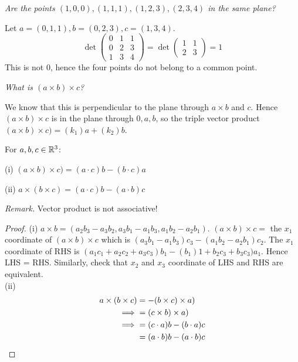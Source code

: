 \documentclass[10pt]{scrartcl}
\begin{document}
\begin{example}
\emph{Are the points $(1,0,0),(1,1,1),(1,2,3),(2,3,4)$ in the same plane? }

Let $a = (0,1,1), b = (0,2,3) , c = (1,3,4)$. 
\[
  \det\begin{pmatrix}
0 & 1 & 1 \\ 0 & 2 & 3 \\ 1 & 3 & 4	
\end{pmatrix} = \det\begin{pmatrix}
1 & 1 \\ 2 & 3 	
\end{pmatrix} = 1
\]
This is not $0$, hence the four points do not belong to a common point. 
\end{example}\vsp


\emph{What is $(a \times b) \times c$?}

We know that this is perpendicular to the plane through $a \times b$ and $c$. Hence $(a \times b) \times c$ is in the plane through $0,a,b$, so the triple vector product $(a \times b) \times c) = (k_1)a + (k_2)b$.\\


\begin{proposition}{\normalfont {} }
For $a,b, c\in\mathbb{R}^3$:

(i) $(a \times b) \times c) = (a \cdot c) b - (b\cdot c)a$

(ii) $a \times (b \times c) = (a\cdot c)b - (a\cdot b)c$
\end{proposition}

\emph{Remark.} Vector product is not associative! 

\begin{proof}
(i) $a \times b= (a_2b_3 - a_3b_2, a_3b_1 - a_1b_3, a_1b_2 - a_2b_1)$. $(a\times b) \times c = $ the $x_1$ coordinate of $(a \times b) \times c$ which is $(a_3b_1 - a_1b_3)c_3 - (a_1b_2 - a_2b_1)c_2$. The $x_1$ coordinate of RHS is $(a_1c_1 + a_2c_2 + a_3c_3)b_1 - (b_1)1 + b_2c_3 + b_3c_3)a_1$. Hence LHS = RHS. Similarly, check that $x_2$ and $x_3$ coordinate of LHS and RHS are equivalent. \\

(ii) 
\begin{align*}
  a \times (b \times c) &= -(b \times c) \times a)\\
  \implies &= (c \times b) \times a)\\
  \implies &= (c \cdot a)b - (b\cdot a)c\\
  &= (a\cdot b)b - (a\cdot b)c\qedhere 
\end{align*}
\end{proof}\vsp
\end{document}
